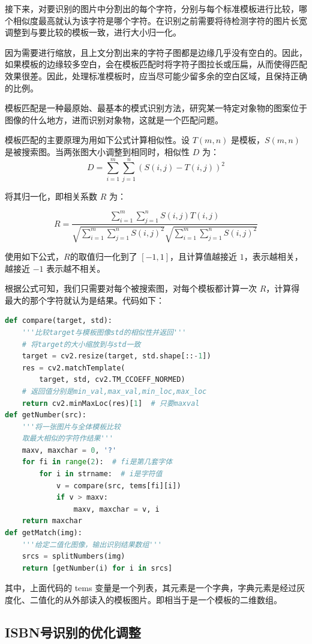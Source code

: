 \documentclass{ctexart}
\begin{document}
接下来，对要识别的图片中分割出的每个字符，分别与每个标准模板进行比较，哪个相似度最高就认为该字符是哪个字符。在识别之前需要将待检测字符的图片长宽调整到与要比较的模板一致，进行大小归一化。

因为需要进行缩放，且上文分割出来的字符子图都是边缘几乎没有空白的。因此，如果模板的边缘较多空白，会在模板匹配时将字符子图拉长或压扁，从而使得匹配效果很差。因此，处理标准模板时，应当尽可能少留多余的空白区域，且保持正确的比例。

模板匹配是一种最原始、最基本的模式识别方法，研究某一特定对象物的图案位于图像的什么地方，进而识别对象物，这就是一个匹配问题。

模板匹配的主要原理为用如下公式计算相似性。设 $T(m,n)$ 是模板，$S(m,n)$ 是被搜索图。当两张图大小调整到相同时，相似性 $D$ 为：
\[D=\sum_{i=1}^m\sum_{j=1}^n(S(i,j)-T(i,j))^2\]

将其归一化，即相关系数 $R$ 为：

\[
R=\frac
{\sum_{i=1}^m\sum_{j=1}^nS(i,j)T(i,j)}
{\sqrt{\sum_{i=1}^m\sum_{j=1}^nS(i,j)^2}
\sqrt{\sum_{i=1}^m\sum_{j=1}^nS(i,j)^2}}
\]

使用如下公式，$R$的取值归一化到了 $[-1,1]$，且计算值越接近 $1$，表示越相关，越接近 $-1$ 表示越不相关。

根据公式可知，我们只需要对每个被搜索图，对每个模板都计算一次 $R$，计算得最大的那个字符就认为是结果。代码如下：

\begin{lstlisting}[language=python]
def compare(target, std):
    '''比较target与模板图像std的相似性并返回'''
    # 将target的大小缩放到与std一致
    target = cv2.resize(target, std.shape[::-1])
    res = cv2.matchTemplate(
        target, std, cv2.TM_CCOEFF_NORMED)
    # 返回值分别是min_val,max_val,min_loc,max_loc
    return cv2.minMaxLoc(res)[1]  # 只要maxval
def getNumber(src):
    '''将一张图片与全体模板比较
    取最大相似的字符作结果'''
    maxv, maxchar = 0, '?'
    for fi in range(2):  # fi是第几套字体
        for i in strname:  # i是字符值
            v = compare(src, tems[fi][i])
            if v > maxv:
                maxv, maxchar = v, i
    return maxchar
def getMatch(img):
    '''给定二值化图像，输出识别结果数组'''
    srcs = splitNumbers(img)
    return [getNumber(i) for i in srcs]
\end{lstlisting}

其中，上面代码的 tems 变量是一个列表，其元素是一个字典，字典元素是经过灰度化、二值化的从外部读入的模板图片。即相当于是一个模板的二维数组。

\subsection{ISBN号识别的优化调整}
\end{document}
